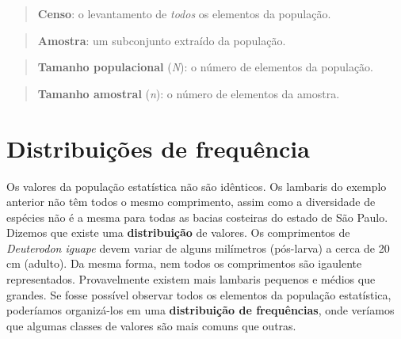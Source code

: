 \documentclass[
]{book}
\begin{document}
\begin{quote}
\textbf{Censo}: o levantamento de \emph{todos} os elementos da população.
\end{quote}

\begin{quote}
\textbf{Amostra}: um subconjunto extraído da população.
\end{quote}

\begin{quote}
\textbf{Tamanho populacional} (\emph{N}): o número de elementos da população.
\end{quote}

\begin{quote}
\textbf{Tamanho amostral} (\emph{n}): o número de elementos da amostra.
\end{quote}

\hypertarget{distribuiuxe7uxf5es-de-frequuxeancia}{%
\section{Distribuições de frequência}\label{distribuiuxe7uxf5es-de-frequuxeancia}}

Os valores da população estatística não são idênticos. Os lambaris do exemplo anterior não têm todos o mesmo comprimento, assim como a diversidade de espécies não é a mesma para todas as bacias costeiras do estado de São Paulo. Dizemos que existe uma \textbf{distribuição} de valores. Os comprimentos de \emph{Deuterodon iguape} devem variar de alguns milímetros (pós-larva) a cerca de 20 cm (adulto). Da mesma forma, nem todos os comprimentos são igaulente representados. Provavelmente existem mais lambaris pequenos e médios que grandes. Se fosse possível observar todos os elementos da população estatística, poderíamos organizá-los em uma \textbf{distribuição de frequências}, onde veríamos que algumas classes de valores são mais comuns que outras.
\end{document}
